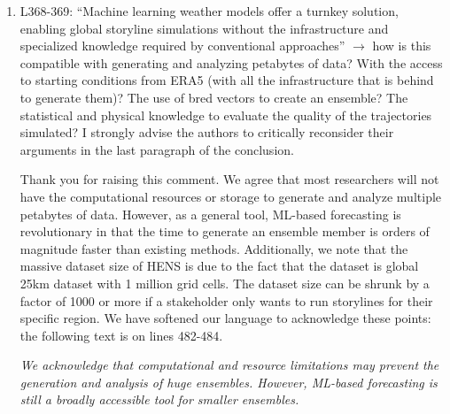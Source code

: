 \documentclass[11pt]{article}
\newcommand{\newTxt}{\textcolor{cadmiumgreen}}
\begin{document}
\begin{enumerate}
    
    \item L368-369: “Machine learning weather models offer a turnkey solution, enabling global storyline simulations without the infrastructure and specialized knowledge required by conventional approaches” $\rightarrow$ how is this compatible with generating and analyzing petabytes of data? With the access to starting conditions from ERA5 (with all the infrastructure that is behind to generate them)? The use of bred vectors to create an ensemble? The statistical and physical knowledge to evaluate the quality of the trajectories simulated? I strongly advise the authors to critically reconsider their arguments in the last paragraph of the conclusion.

    \newTxt{Thank you for raising this comment. We agree that most researchers will not have the computational resources or storage to generate and analyze multiple petabytes of data. However, as a general tool, ML-based forecasting is revolutionary in that the time to generate an ensemble member is orders of magnitude faster than existing methods.  Additionally, we note that the massive dataset size of HENS is due to the fact that the dataset is global 25km dataset with 1 million grid cells.  The dataset size can be shrunk by a factor of 1000 or more if a stakeholder only wants to run storylines for their specific region.  We have softened our language to acknowledge these points: the following text is on lines 482-484.}

    \newTxt{\sl We acknowledge that computational and resource limitations may prevent the generation and analysis of huge ensembles. However, ML-based forecasting is still a broadly accessible tool for smaller ensembles.}
    

\end{enumerate}
\end{document}
